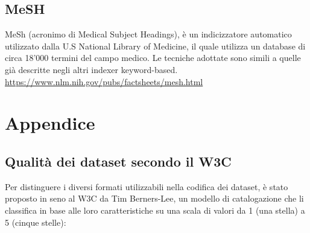 \documentclass{article}
\theoremstyle{plain}
\theoremstyle{definition}
\begin{document}
\subsection{MeSH}
MeSh (acronimo di Medical Subject Headings), è un indicizzatore automatico utilizzato dalla U.S National Library of Medicine, il quale utilizza un database di circa 18'000 termini del campo medico. Le tecniche adottate sono simili a quelle già descritte negli altri indexer keyword-based.
\url{https://www.nlm.nih.gov/pubs/factsheets/mesh.html}

\newpage
\section{Appendice}

\subsection{Qualità dei dataset secondo il W3C}
Per distinguere i diversi formati utilizzabili nella codifica dei dataset, è stato proposto in seno al W3C da Tim Berners-Lee, un modello di catalogazione che li classifica in base alle loro caratteristiche su una scala di valori da 1 (una stella) a 5 (cinque stelle):
\\
\end{document}
